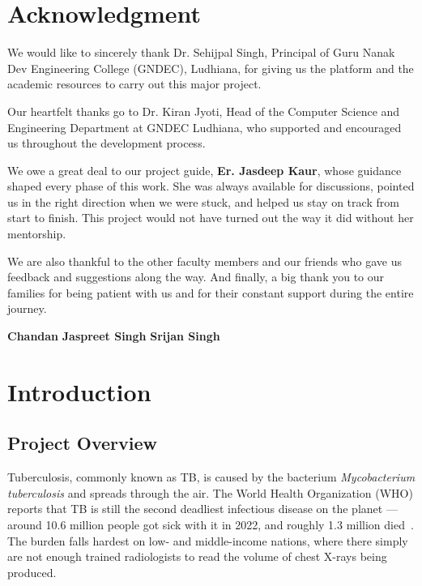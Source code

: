 \documentclass[12pt]{report}
\begin{document}
\chapter*{Acknowledgment}
\doublespacing

We would like to sincerely thank Dr. Sehijpal Singh, Principal of Guru Nanak Dev Engineering College (GNDEC), Ludhiana, for giving us the platform and the academic resources to carry out this major project.

Our heartfelt thanks go to Dr. Kiran Jyoti, Head of the Computer Science and Engineering Department at GNDEC Ludhiana, who supported and encouraged us throughout the development process.

We owe a great deal to our project guide, \textbf{Er. Jasdeep Kaur}, whose guidance shaped every phase of this work. She was always available for discussions, pointed us in the right direction when we were stuck, and helped us stay on track from start to finish. This project would not have turned out the way it did without her mentorship.

We are also thankful to the other faculty members and our friends who gave us feedback and suggestions along the way. And finally, a big thank you to our families for being patient with us and for their constant support during the entire journey.

\vspace{1cm}

\textbf{Chandan} \newline
\textbf{Jaspreet Singh} \newline
\textbf{Srijan Singh}

\tableofcontents
\listoffigures
\listoftables
\newpage
{}
\setcounter{page}{1}

\chapter{Introduction}
\doublespacing

\section{Project Overview}

Tuberculosis, commonly known as TB, is caused by the bacterium \textit{Mycobacterium tuberculosis} and spreads through the air. The World Health Organization (WHO) reports that TB is still the second deadliest infectious disease on the planet --- around 10.6 million people got sick with it in 2022, and roughly 1.3 million died~\cite{ref10}. The burden falls hardest on low- and middle-income nations, where there simply are not enough trained radiologists to read the volume of chest X-rays being produced.
\end{document}
